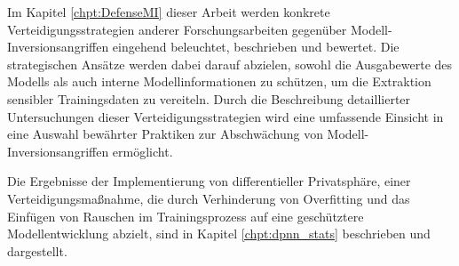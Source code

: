 Im Kapitel \ref{chpt:DefenseMI} dieser Arbeit werden konkrete Verteidigungsstrategien anderer Forschungsarbeiten gegenüber Modell-Inversionsangriffen eingehend beleuchtet, beschrieben und bewertet. Die strategischen Ansätze werden dabei darauf abzielen, sowohl die Ausgabewerte des Modells als auch interne Modellinformationen zu schützen, um die Extraktion sensibler Trainingsdaten zu vereiteln. Durch die Beschreibung detaillierter Untersuchungen dieser Verteidigungsstrategien wird eine umfassende Einsicht in eine Auswahl bewährter Praktiken zur Abschwächung von Modell-Inversionsangriffen ermöglicht.

Die Ergebnisse der Implementierung von differentieller Privatsphäre, einer Verteidigungsmaßnahme, die durch Verhinderung von Overfitting und das Einfügen von Rauschen im Trainingsprozess auf eine geschütztere Modellentwicklung abzielt, sind in Kapitel \ref{chpt:dpnn_stats} beschrieben und dargestellt.
